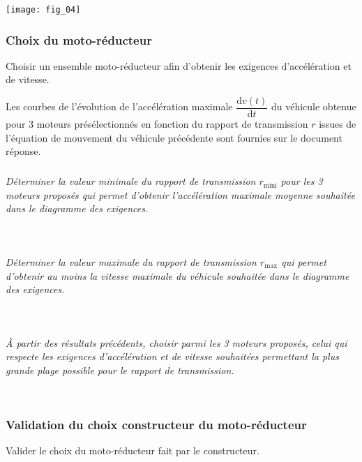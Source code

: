\begin{multicols}{2}
\begin{center}
\texttt{[image: fig\_04]}
\end{center}


\subsubsection*{Choix du moto-réducteur}
\begin{obj}
Choisir un ensemble moto-réducteur afin d’obtenir les exigences d’accélération et de vitesse.
\end{obj}

Les courbes de l’évolution de l’accélération maximale $\dfrac{\text{d} v(t)}{\text{d} t}$
du véhicule obtenue pour 3 moteurs présélectionnés en fonction du rapport de transmission $r$ issues de l’équation de mouvement du véhicule précédente sont fournies sur le document réponse.




\subparagraph{}\textit{Déterminer la valeur minimale du rapport de transmission $r_{\text{mini}}$ pour les 3 moteurs proposés qui permet d’obtenir l’accélération maximale moyenne souhaitée dans le diagramme des exigences.}
\ifprof
\begin{corrige}~\\
\end{corrige}
\else
\fi


\subparagraph{}\textit{Déterminer la valeur maximale du rapport de transmission $r_{\text{max}}$ qui permet d’obtenir au moins la vitesse maximale du véhicule souhaitée dans le diagramme des exigences.}
\ifprof
\begin{corrige}~\\
\end{corrige}
\else
\fi


\subparagraph{}\textit{À partir des résultats précédents, choisir parmi les 3 moteurs proposés, celui qui respecte les exigences d’accélération et de vitesse souhaitées permettant la plus grande plage possible pour le rapport de transmission.}
\ifprof
\begin{corrige}~\\
\end{corrige}
\else
\fi


\subsubsection*{Validation du choix constructeur du moto-réducteur}
\begin{obj}
Valider le choix du moto-réducteur fait par le constructeur.
\end{obj}


\end{multicols}
